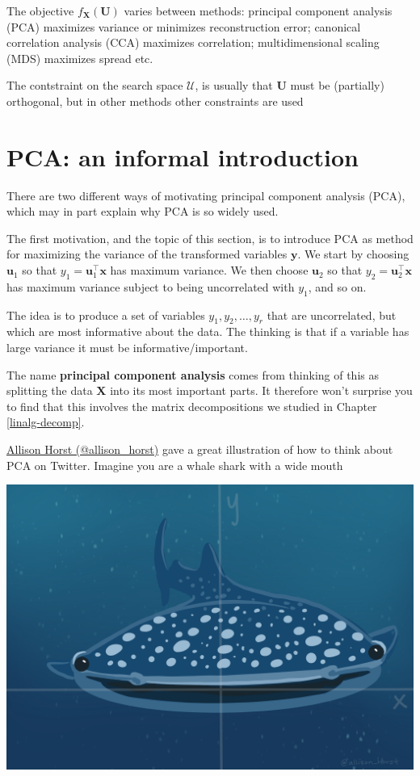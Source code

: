 \documentclass[
]{book}
\theoremstyle{definition}
\theoremstyle{definition}
\theoremstyle{definition}
\theoremstyle{definition}
\theoremstyle{remark}
\begin{document}
The objective \(f_{\mathbf X}(\mathbf U)\) varies between methods: principal component analysis (PCA) maximizes variance or minimizes reconstruction error; canonical correlation analysis (CCA) maximizes correlation; multidimensional scaling (MDS) maximizes spread etc.

The contstraint on the search space \(\mathcal{U}\), is usually that \(\mathbf U\) must be (partially) orthogonal, but in other methods other constraints are used

\section{PCA: an informal introduction}\label{pca-an-informal-introduction}

There are two different ways of motivating
principal component analysis (PCA), which may in part explain why PCA is so widely used.

The first motivation, and the topic of this section, is to introduce PCA as method for maximizing the variance of the transformed variables \(\mathbf y\). We start by choosing \(\mathbf u_1\) so that \(y_1=\mathbf u_1^\top \mathbf x\) has maximum variance. We then choose \(\mathbf u_2\) so that \(y_2=\mathbf u_2^\top \mathbf x\) has maximum variance subject to being uncorrelated with \(y_1\), and so on.

The idea is to produce a set of variables \(y_1, y_2, \ldots, y_r\) that are uncorrelated, but which are most informative about the data. The thinking is that if a variable has large variance it must be informative/important.

The name \textbf{principal component analysis} comes from thinking of this as splitting the data \(\mathbf X\) into its most important parts. It therefore won't surprise you to find that this involves the matrix decompositions we studied in Chapter \ref{linalg-decomp}.

\href{https://twitter.com/allison_horst/status/1288904459490213888?lang=en}{Allison Horst (@allison\_horst)} gave a great illustration of how to think about PCA on Twitter. Imagine you are a whale shark with a wide mouth

\includegraphics{figs/WideMouthShark1.png}
\end{document}
